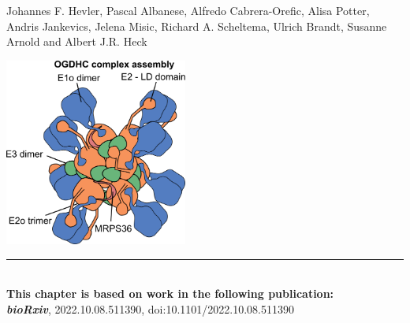  \label{ch-5}
\vspace*{0.25cm}

\footnotesize Johannes F. Hevler, Pascal Albanese, Alfredo Cabrera-Orefic, Alisa Potter, Andris Jankevics, Jelena Misic, Richard A. Scheltema, Ulrich Brandt, Susanne Arnold and Albert J.R. Heck
%
\begin{center}
	\vspace{1.5cm}
	\includegraphics[width=0.45\textwidth]{Chapter.5/Figures/OGDHC_schematic.png}
	\vspace{0.5cm}
\end{center}
%
\begin{flushleft}
	\vspace*{\fill}
	\rule{\textwidth}{1pt}\\[0cm]
	\textbf{This chapter is based on work in the following publication:}\\
	\footnotesize
	\textbf{\emph{bioRxiv}}, 2022.10.08.511390, doi:10.1101/2022.10.08.511390
\end{flushleft}
%
